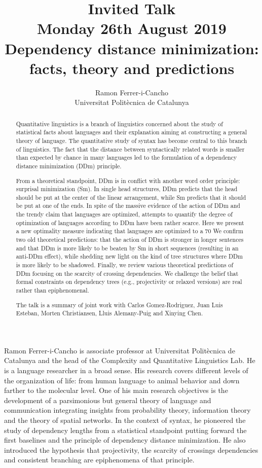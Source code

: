 \documentclass[11pt]{article}
\title{Invited Talk\\
  {\small Monday 26th August 2019}\\
  Dependency distance minimization: facts, theory and predictions}
\author{Ramon Ferrer-i-Cancho\\
  Universitat Politècnica de Catalunya}
\begin{document}
\maketitle
\begin{abstract}
  Quantitative linguistics is a branch of linguistics concerned about the study of statistical facts about languages and their explanation aiming at constructing a general theory of language. The quantitative study of syntax has become central to this branch of linguistics. The fact that the distance between syntactically related words is smaller than expected by chance in many languages led to the formulation of a dependency distance minimization (DDm) principle.
  
From a theoretical standpoint, DDm is in conflict with another word order principle: surprisal minimization (Sm). In single head structures, DDm predicts that the head should be put at the center of the linear arrangement, while Sm predicts that it should be put at one of the ends.  In spite of the massive evidence of the action of DDm and the trendy claim that languages are optimized, attempts to quantify the degree of optimization of languages according to DDm have been rather scarce. Here we present a new optimality measure indicating that languages are optimized to a 70%
We confirm two old theoretical predictions: that the action of DDm is stronger in longer sentences and that DDm is more likely to be beaten by Sm in short sequences (resulting in an anti-DDm effect), while shedding new light on the kind of tree structures where DDm is more likely to be shadowed. Finally, we review various theoretical predictions of DDm focusing on the scarcity of crossing dependencies. We challenge the belief that formal constraints on dependency trees (e.g., projectivity or relaxed versions) are real rather than epiphenomenal.

The talk is a summary of joint work with Carlos Gomez-Rodriguez, Juan Luis Esteban, Morten Christiansen, Lluis Alemany-Puig and Xinying Chen.
\end{abstract}

\vspace{4mm}
\begin{shortbio}
Ramon Ferrer-i-Cancho is associate professor at Universitat Politècnica de Catalunya and the head of the Complexity and Quantitative Linguistics Lab. He is a language researcher in a broad sense. His research covers different levels of the organization of life: from human language to animal behavior and down farther to the molecular level. One of his main research objectives is the development of a parsimonious but general theory of language and communication integrating insights from probability theory, information theory and the theory of spatial networks. In the context of syntax, he pioneered the study of dependency lengths from a statistical standpoint putting forward the first baselines and the principle of dependency distance minimization. He also introduced the hypothesis that projectivity, the scarcity of crossings dependencies and consistent branching are epiphenomena of that principle. 
\end{shortbio}
\end{document}
